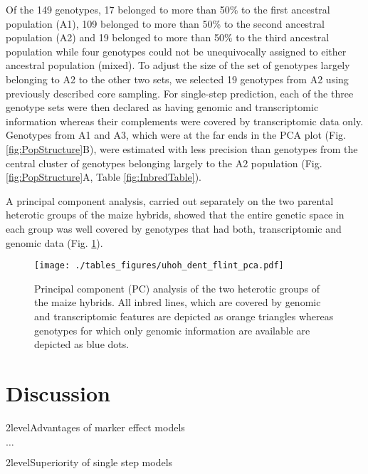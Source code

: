 \documentclass[12pt,titlepage]{article}
\begin{document}
Of the 149 genotypes, 17 belonged to more than 50\% to the first ancestral
population (A1), 109 belonged to more than 50\% to the second ancestral
population (A2) and 19 belonged to more than 50\% to the third ancestral
population while four genotypes could not be unequivocally assigned to either
ancestral population (mixed).
To adjust the size of the set of genotypes largely belonging to A2 to the other
two sets, we selected 19 genotypes from A2 using previously described core
sampling.
For single-step prediction, each of the three genotype sets were then declared
as having genomic and transcriptomic information whereas their complements were
covered by transcriptomic data only.
Genotypes from A1 and A3, which were at the far ends in the PCA plot (Fig.
\ref{fig:PopStructure}B), were estimated with less precision than genotypes
from the central cluster of genotypes belonging largely to the A2 population
(Fig. \ref{fig:PopStructure}A, Table \ref{fig:InbredTable}).


A principal component analysis, carried out separately on the two parental
heterotic groups of the maize hybrids, showed that the entire genetic space in
each group was well covered by genotypes that had both, transcriptomic and
genomic data (Fig. \ref{fig:UHOH-PCA}).

\begin{figure}[H]
\centering
\texttt{[image: ./tables\_figures/uhoh\_dent\_flint\_pca.pdf]}
\caption{
  Principal component (PC) analysis of the two heterotic groups of the maize 
  hybrids.
  All inbred lines, which are covered by genomic and transcriptomic features
  are depicted as orange triangles whereas genotypes for which only genomic
  information are available are depicted as blue dots.
}
\label{fig:UHOH-PCA}
\end{figure}













\section*{Discussion}


\Genetics2level{Advantages of marker effect models}

$\dots$

\Genetics2level{Superiority of single step models}
\end{document}
